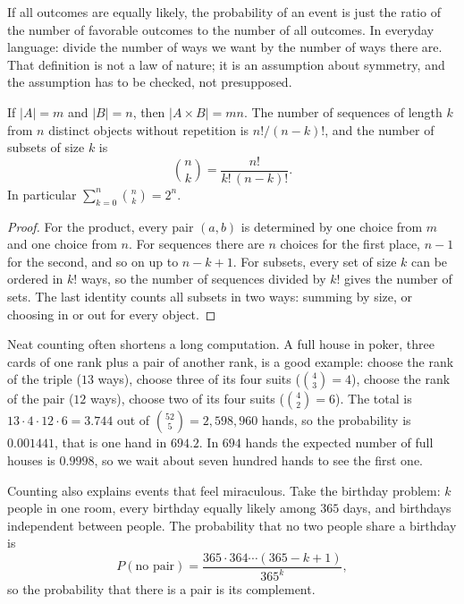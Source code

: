 If all outcomes are equally likely, the probability of an event is just the ratio of the
number of favorable outcomes to the number of all outcomes. In everyday language: divide
the number of ways we want by the number of ways there are. That definition is not a law of
nature; it is an assumption about symmetry, and the assumption has to be checked, not
presupposed.



\begin{proposisi}
If $|A|=m$ and $|B|=n$, then $|A\times B|=mn$. The number of sequences of length $k$ from
$n$ distinct objects without repetition is $n!/(n-k)!$, and the number of subsets of size
$k$ is
\[
\binom{n}{k}=\frac{n!}{k!\,(n-k)!}.
\]
In particular $\sum_{k=0}^{n}\binom{n}{k}=2^{n}$.
\end{proposisi}

\begin{proof}
For the product, every pair $(a,b)$ is determined by one choice from $m$ and one choice
from $n$. For sequences there are $n$ choices for the first place, $n-1$ for the second,
and so on up to $n-k+1$. For subsets, every set of size $k$ can be ordered in $k!$ ways, so
the number of sequences divided by $k!$ gives the number of sets. The last identity counts
all subsets in two ways: summing by size, or choosing in or out for every object.
\end{proof}

Neat counting often shortens a long computation. A full house in poker, three cards of one
rank plus a pair of another rank, is a good example: choose the rank of the triple ($13$
ways), choose three of its four suits ($\binom{4}{3}=4$), choose the rank of the pair ($12$
ways), choose two of its four suits ($\binom{4}{2}=6$). The total is
$13\cdot 4\cdot 12\cdot 6=3.744$ out of $\binom{52}{5}=2{,}598{,}960$ hands, so the
probability is $0.001441$, that is one hand in $694.2$. In $694$ hands the expected number
of full houses is $0.9998$, so we wait about seven hundred hands to see the first one.

Counting also explains events that feel miraculous. Take the birthday problem: $k$ people
in one room, every birthday equally likely among $365$ days, and birthdays independent
between people. The probability that no two people share a birthday is
\[
P(\text{no pair})=\frac{365\cdot 364\cdots (365-k+1)}{365^{k}},
\]
so the probability that there is a pair is its complement.

